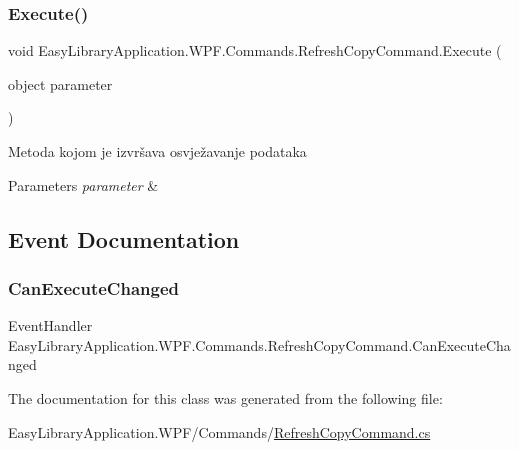 \subsubsection{\texorpdfstring{Execute()}{Execute()}}
{\footnotesize\ttfamily void Easy\+Library\+Application.\+W\+P\+F.\+Commands.\+Refresh\+Copy\+Command.\+Execute (\begin{DoxyParamCaption}\item[{object}]{parameter }\end{DoxyParamCaption})}



Metoda kojom je izvršava osvježavanje podataka 


\begin{DoxyParams}{Parameters}
{\em parameter} & \\
\hline
\end{DoxyParams}


\subsection{Event Documentation}
\mbox{\label{class_easy_library_application_1_1_w_p_f_1_1_commands_1_1_refresh_copy_command_a989b474703bc7593e587b31857886b30}} 
\subsubsection{\texorpdfstring{Can\+Execute\+Changed}{CanExecuteChanged}}
{\footnotesize\ttfamily Event\+Handler Easy\+Library\+Application.\+W\+P\+F.\+Commands.\+Refresh\+Copy\+Command.\+Can\+Execute\+Changed}



The documentation for this class was generated from the following file\+:\begin{DoxyCompactItemize}
\item 
Easy\+Library\+Application.\+W\+P\+F/\+Commands/\mbox{\hyperlink{_refresh_copy_command_8cs}{Refresh\+Copy\+Command.\+cs}}\end{DoxyCompactItemize}
